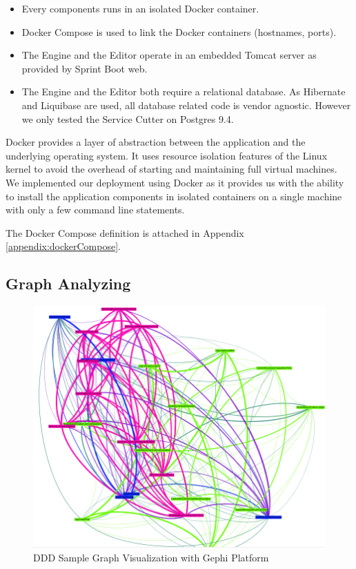 \begin{itemize}
\item Every components runs in an isolated Docker\cite{docker} container.
\item Docker Compose\cite{dockercompose} is used to link the Docker containers (hostnames, ports).
\item The Engine and the Editor operate in an embedded Tomcat server as provided by Sprint Boot web.
\item The Engine and the Editor both require a relational database. As Hibernate\cite{hibernate} and Liquibase\cite{liquibase} are used, all database related code is vendor agnostic. However we only tested the Service Cutter on Postgres 9.4\cite{postgres}.
\end{itemize}

Docker provides a layer of abstraction between the application and the underlying operating system. It uses resource isolation features of the Linux kernel to avoid the overhead of starting and maintaining full virtual machines. We implemented our deployment using Docker as it provides us with the ability to install the application components in isolated containers on a single machine with only a few command line statements.

The Docker Compose definition is attached in Appendix \ref{appendix:dockerCompose}.


\subsection{Graph Analyzing}


\begin{figure}[H]
	\includegraphics[scale=0.7]{images/ddd_semantic_proximity_debug.png}
	\caption{DDD Sample Graph Visualization with Gephi Platform}
	\label{fig:dddSampleGraph}
\end{figure}

